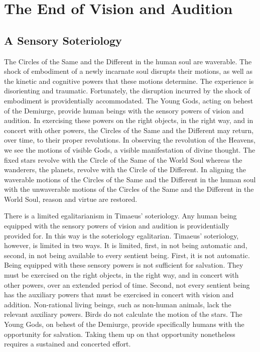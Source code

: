 \chapter{The End of Vision and Audition} %
\label{cha:the_end_of_vision_and_audition}

\section{A Sensory Soteriology} %
\label{sec:a_sensory_soteriology}
The Circles of the Same and the Different in the human soul are waverable. The shock of embodiment of a newly incarnate soul disrupts their motions, as well as the kinetic and cognitive powers that these motions determine. The experience is disorienting and traumatic. Fortunately, the disruption incurred by the shock of embodiment is providentially accommodated. The Young Gods, acting on behest of the Demiurge, provide human beings with the sensory powers of vision and audition. In exercising these powers on the right objects, in the right way, and in concert with other powers, the Circles of the Same and the Different may return, over time, to their proper revolutions. In observing the revolution of the Heavens, we see the motions of visible Gods, a visible manifestation of divine thought. The fixed stars revolve with the Circle of the Same of the World Soul whereas the wanderers, the planets, revolve with the Circle of the Different. In aligning the waverable motions of the Circles of the Same and the Different in the human soul with the unwaverable motions of the Circles of the Same and the Different in the World Soul, reason and virtue are restored. 

There is a limited egalitarianism in Timaeus' soteriology. Any human being equip\-ped with the sensory powers of vision and audition is providentially provided for. In this way is the soteriology egalitarian. Timaeus' soteriology, however, is limited in two ways. It is limited, first, in not being automatic and, second, in not being available to every sentient being. First, it is not automatic. Being equipped with these sensory powers is not sufficient for salvation. They must be exercised on the right objects, in the right way, and in concert with other powers, over an extended period of time. Second, not every sentient being has the auxiliary powers that must be exercised in concert with vision and addition. Non-rational living beings, such as non-human animals, lack the relevant auxiliary powers. Birds do not calculate the motion of the stars. The Young Gods, on behest of the Demiurge, provide specifically humans with the opportunity for salvation. Taking them up on that opportunity nonetheless requires a sustained and concerted effort.

